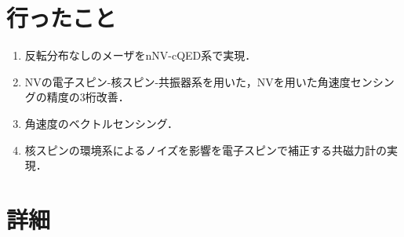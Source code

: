 \documentclass{report}
\begin{document}
    \section{行ったこと}
      \begin{enumerate}
        \item 反転分布なしのメーザをnNV-cQED系で実現．
        \item NVの電子スピン-核スピン-共振器系を用いた，NVを用いた角速度センシングの精度の3桁改善．
        \item 角速度のベクトルセンシング．
        \item 核スピンの環境系によるノイズを影響を電子スピンで補正する共磁力計の実現．
      \end{enumerate}
    \section{詳細}
\end{document}

